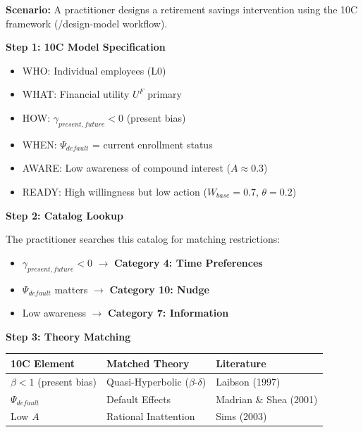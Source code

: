 \begin{tcolorbox}[colback=green!5!white, colframe=green!75!black,
    title=\textbf{Worked Example: Retirement Savings Intervention}]

\textbf{Scenario:} A practitioner designs a retirement savings intervention
using the 10C framework (/design-model workflow).

\textbf{Step 1: 10C Model Specification}
\begin{itemize}[nosep]
    \item WHO: Individual employees (L0)
    \item WHAT: Financial utility $U^F$ primary
    \item HOW: $\gamma_{present,future} < 0$ (present bias)
    \item WHEN: $\Psi_{default}$ = current enrollment status
    \item AWARE: Low awareness of compound interest ($A \approx 0.3$)
    \item READY: High willingness but low action ($W_{base} = 0.7$, $\theta = 0.2$)
\end{itemize}

\textbf{Step 2: Catalog Lookup}

The practitioner searches this catalog for matching restrictions:
\begin{itemize}[nosep]
    \item $\gamma_{present,future} < 0$ $\rightarrow$ \textbf{Category 4: Time Preferences}
    \item $\Psi_{default}$ matters $\rightarrow$ \textbf{Category 10: Nudge}
    \item Low awareness $\rightarrow$ \textbf{Category 7: Information}
\end{itemize}

\textbf{Step 3: Theory Matching}

\begin{center}
\begin{tabular}{@{}lll@{}}
\toprule
\textbf{10C Element} & \textbf{Matched Theory} & \textbf{Literature} \\
\midrule
$\beta < 1$ (present bias) & Quasi-Hyperbolic ($\beta$-$\delta$) & Laibson (1997) \\
$\Psi_{default}$ & Default Effects & Madrian \& Shea (2001) \\
Low $A$ & Rational Inattention & Sims (2003) \\
\bottomrule
\end{tabular}
\end{center}


\end{tcolorbox}
